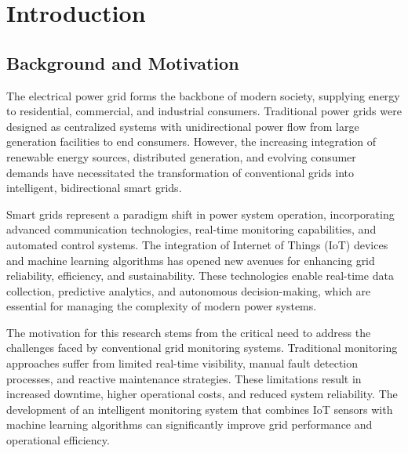 
\chapter{Introduction}
\label{chap:introduction}
\justifying
\section{Background and Motivation}
\label{sec:background}

The electrical power grid forms the backbone of modern society, supplying energy to residential, commercial, and industrial consumers. Traditional power grids were designed as centralized systems with unidirectional power flow from large generation facilities to end consumers. However, the increasing integration of renewable energy sources, distributed generation, and evolving consumer demands have necessitated the transformation of conventional grids into intelligent, bidirectional smart grids.

Smart grids represent a paradigm shift in power system operation, incorporating advanced communication technologies, real-time monitoring capabilities, and automated control systems. The integration of Internet of Things (IoT) devices and machine learning algorithms has opened new avenues for enhancing grid reliability, efficiency, and sustainability. These technologies enable real-time data collection, predictive analytics, and autonomous decision-making, which are essential for managing the complexity of modern power systems.

The motivation for this research stems from the critical need to address the challenges faced by conventional grid monitoring systems. Traditional monitoring approaches suffer from limited real-time visibility, manual fault detection processes, and reactive maintenance strategies. These limitations result in increased downtime, higher operational costs, and reduced system reliability. The development of an intelligent monitoring system that combines IoT sensors with machine learning algorithms can significantly improve grid performance and operational efficiency.

